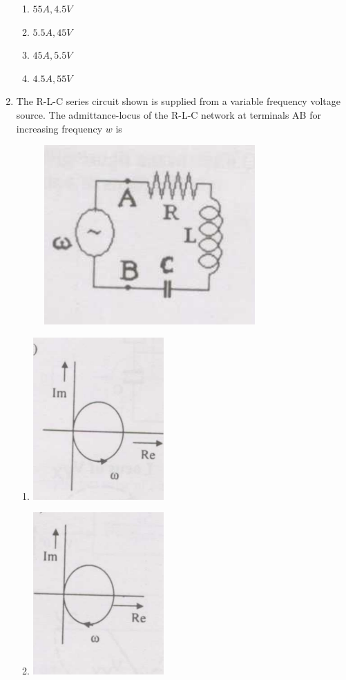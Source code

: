 \documentclass[journal,12pt,onecolumn]{IEEEtran}
\theoremstyle{remark}
\begin{document}
\begin{enumerate}
\begin{figure}[h]
	\label{Fig-7}
\end{figure}
\begin{enumerate}
\item $55 A, 4.5 V$
\item $5.5 A, 45 V$
\item $45 A, 5.5 V$
\item $4.5 A, 55V$
\end{enumerate}
\item The R-L-C series circuit shown is supplied from a variable frequency voltage source. The admittance-locus of the R-L-C network at terminals AB for increasing frequency $w$ is
\begin{figure}[h]
	\centering
	\includegraphics[scale=0.5]{figs/fig 11.png}
	\label{Fig-7}
\end{figure}
\begin{enumerate}
\item \includegraphics[width=5cm]{figs/fig 11.1.png}
\item \includegraphics[width=5cm]{figs/fig 11.2.png}

\end{enumerate}
\end{enumerate}
\end{document}
